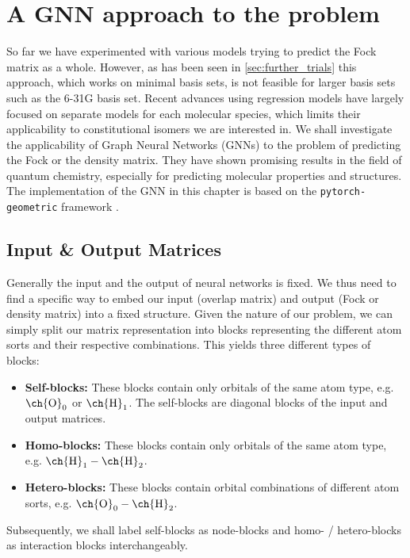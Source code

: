 \chapter{A GNN approach to the problem}
\label{chap:gnn}
So far we have experimented with various models trying to predict the Fock matrix as a whole. However, as has been seen in \autoref{sec:further_trials} this approach, which works on minimal basis sets, is not feasible for larger basis sets such as the 6-31G basis set. Recent advances using regression models have largely focused on separate models for each molecular species, which limits their applicability to constitutional isomers we are interested in. \parencite{ref:Hazra2024,ref:Shao2023}
We shall investigate the applicability of Graph Neural Networks (GNNs) to the problem of predicting the Fock or the density matrix. They have shown promising results in the field of quantum chemistry, especially for predicting molecular properties and structures. \parencite{ref:schnet2018}  \\

The implementation of the GNN in this chapter is based on the \texttt{pytorch-geometric} framework \parencite{ref:PyTorchGeometric, ref:PyTorch_geom_paper}. 
\section{Input \& Output Matrices}
\label{sec:gnn_input_output_matrices}
Generally the input and the output of neural networks is fixed. We thus need to find a specific way to embed our input (overlap matrix) and output (Fock or density matrix) into a fixed structure. Given the nature of our problem, we can simply split our matrix representation into blocks representing the different atom sorts and their respective combinations. This yields three different types of blocks: 
\begin{itemize}
    \item \textbf{Self-blocks:} These blocks contain only orbitals of the same atom type, e.g. $\text{\ch{O}}_0$ or $\text{\ch{H}}_1$. The self-blocks are diagonal blocks of the input and output matrices.
    \item \textbf{Homo-blocks:} These blocks contain only orbitals of the same atom type, e.g. $\text{\ch{H}}_1 - \text{\ch{H}}_2$.
    \item \textbf{Hetero-blocks:} These blocks contain orbital combinations of different atom sorts, e.g. $\text{\ch{O}}_0 - \text{\ch{H}}_2$.
\end{itemize}
Subsequently, we shall label self-blocks as node-blocks and homo- / hetero-blocks as interaction blocks interchangeably. 

